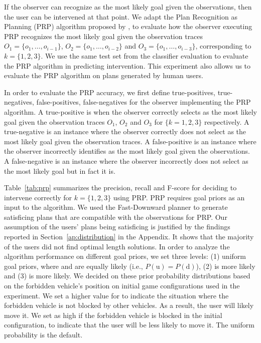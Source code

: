 If the observer can recognize \undesired as the most likely goal given the observations, then the user can be intervened at that point.
We adapt the Plan Recognition as Planning (PRP) algorithm proposed by \cite{ramirez2010probabilistic}, to evaluate how the observer
executing PRP recognizes the most likely goal given the observation traces $O_1=\lbrace o_1, \ldots, o_{i-1}\rbrace$, $O_2=\lbrace o_1, \ldots, o_{i-2}\rbrace$ and $O_3=\lbrace o_1, \ldots, o_{i-3}\rbrace$, corresponding to $k=\lbrace 1,2,3\rbrace$.
We use the same test set from the classifier evaluation to evaluate the PRP algorithm in predicting intervention.
This experiment also allows us to evaluate the PRP algorithm on plans generated by human users.

In order to evaluate the PRP accuracy, we first define true-positives, true-negatives, false-positives, false-negatives for the observer implementing the PRP algorithm. 
A true-positive is when the observer correctly selects \undesired as the most likely goal given the observation traces $O_1$, $O_2$ and $O_3$ for $\lbrace k=1,2,3\rbrace$ respectively.
A true-negative is an instance where the observer correctly does not select \undesired as the most likely goal given the observation traces. 
A false-positive is an instance where the observer incorrectly identifies \undesired as the most likely goal given the observations. 
A false-negative is an instance where the observer incorrectly does not select \undesired as the most likely goal but in fact it is.

Table~\ref{tab:prp} summarizes the precision, recall and F-score for deciding to intervene correctly for $k=\lbrace 1,2,3\rbrace$ using PRP. 
PRP requires goal priors as an input to the algorithm. 
We used the Fast-Downward planner \cite{richterWestphal10.jair.LAMA} to generate satisficing plans that are compatible with the observations for PRP. 
Our assumption of the users' plans being satisficing is justified by the findings reported in Section~\ref{ap:distribution} in the Appendix. 
It shows that the majority of the users did not find optimal length solutions.
In order to analyze the algorithm performance on different goal priors, we set three levels: (1) uniform goal priors, where \undesired and \desired are equally likely (i.e., $P(\mathrm{u})=P(\mathrm{d})$), (2) \undesired is more likely and (3) \desired is more likely. 
We decided on these prior probability distributions based on the forbidden vehicle's position on initial game configurations used in the experiment. 
We set a higher value for \undesired to indicate the situation where the forbidden vehicle is not blocked by other vehicles. 
As a result, the user will likely move it. 
We set \desired as high if the forbidden vehicle is blocked in the initial configuration, to indicate that the user will be less likely to move it. 
The uniform probability is the default.

